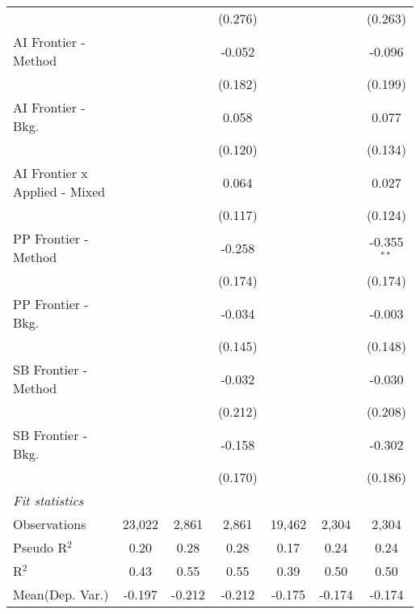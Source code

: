 \begin{tabular}{lcccccc}
                                 &               &         & (0.276) &               &         & (0.263)\\   
   AI Frontier - Method          &               &         & -0.052  &               &         & -0.096\\   
                                 &               &         & (0.182) &               &         & (0.199)\\   
   AI Frontier - Bkg.            &               &         & 0.058   &               &         & 0.077\\   
                                 &               &         & (0.120) &               &         & (0.134)\\   
   AI Frontier x Applied - Mixed &               &         & 0.064   &               &         & 0.027\\   
                                 &               &         & (0.117) &               &         & (0.124)\\   
   PP Frontier - Method          &               &         & -0.258  &               &         & -0.355$^{**}$\\   
                                 &               &         & (0.174) &               &         & (0.174)\\   
   PP Frontier - Bkg.            &               &         & -0.034  &               &         & -0.003\\   
                                 &               &         & (0.145) &               &         & (0.148)\\   
   SB Frontier - Method          &               &         & -0.032  &               &         & -0.030\\   
                                 &               &         & (0.212) &               &         & (0.208)\\   
   SB Frontier - Bkg.            &               &         & -0.158  &               &         & -0.302\\   
                                 &               &         & (0.170) &               &         & (0.186)\\   
   \midrule
   \emph{Fit statistics}\\
   Observations                  & 23,022        & 2,861   & 2,861   & 19,462        & 2,304   & 2,304\\  
   Pseudo R$^2$                  & 0.20          & 0.28    & 0.28    & 0.17          & 0.24    & 0.24\\  
   R$^2$                         & 0.43          & 0.55    & 0.55    & 0.39          & 0.50    & 0.50\\  
Mean(Dep. Var.) & -0.197 & -0.212 & -0.212 & -0.175 & -0.174 & -0.174 \\
   

\end{tabular}
